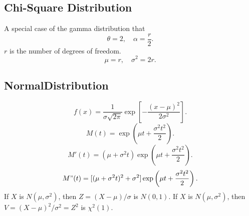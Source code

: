\documentclass[10pt,landscape,a4paper]{article}
\begin{document}
\begin{multicols*}{5}
        \subsection*{Chi-Square Distribution}
        A special case of the gamma distribution that
        \[
                \theta = 2, \quad
                \alpha = \frac{r}{2}
        .\] 
        $r$ is the number of degrees of freedom.
        \[
                \mu = r, \quad \sigma^2 = 2r
        .\] 
        \subsection*{NormalDistribution}
        \[
                f(x) = \frac{1}{\sigma \sqrt{2 \pi}} 
                \exp [- \frac{(x-\mu)^2}{2 \sigma^2}]
        .\]
        \[
                M(t) = \exp \left( \mu t + \frac{\sigma^2 t^2}{2} \right)
        .\] 
        \[
                M'(t) = (\mu + \sigma^2 t) 
                \exp \left( \mu t + \frac{\sigma^2 t^2}{2} \right)
        .\]
        \[
                M"(t) = [(\mu + \sigma^2 t)^2 + \sigma^2] 
                \exp \left( \mu t + \frac{\sigma^2 t^2}{2} \right) 
        .\]
        If $X$ is  $N(\mu, \sigma^2)$,
        then $Z = (X-\mu) / \sigma$ is $N(0,1)$.
        If $X$ is  $N(\mu,\sigma^2)$,
        then $V = (X-\mu)^2 / \sigma^2 = Z^2$ is  $\chi^2(1)$.
\end{multicols*}
\end{document}
